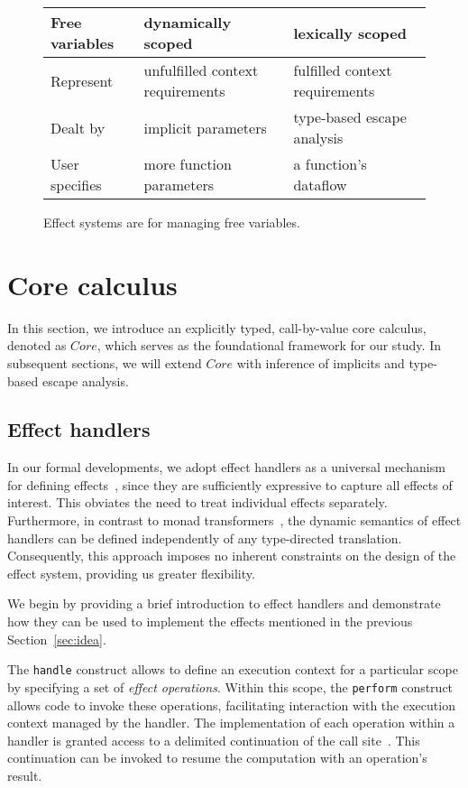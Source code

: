 \documentclass[acmsmall,review,screen]{acmart}
\begin{document}
\begin{figure}
    \centering
    \begin{tabular}{|l|l|l|}
        \hline
        Free variables & dynamically scoped & lexically scoped \\
        \hline
        Represent & unfulfilled context requirements & fulfilled context requirements \\
        Dealt by & implicit parameters & type-based escape analysis \\
        User specifies & more function parameters & a function’s dataflow \\
        \hline
    \end{tabular}
    \caption{Effect systems are for managing free variables.}
    \label{fig:free-vars}
\end{figure}


\section{Core calculus} \label{sec:core}

In this section, we introduce an explicitly typed, call-by-value core calculus, denoted as $Core$, which serves as the foundational framework for our study.
In subsequent sections, we will extend $Core$ with inference of implicits and type-based escape analysis.

\subsection{Effect handlers} \label{subsec:handlers}

In our formal developments, we adopt effect handlers as a universal mechanism for defining effects~\cite{plotkin2003algebraic, plotkin2013handling}, since they are sufficiently expressive to capture all effects of interest.
This obviates the need to treat individual effects separately.
Furthermore, in contrast to monad transformers~\cite{liang1995monad, schrijvers2019monad}, the dynamic semantics of effect handlers can be defined independently of any type-directed translation.
Consequently, this approach imposes no inherent constraints on the design of the effect system, providing us greater flexibility.

We begin by providing a brief introduction to effect handlers and demonstrate how they can be used to implement the effects mentioned in the previous Section~\ref{sec:idea}.

The \lstinline[language=colang]{handle} construct allows to define an execution context for a particular scope by specifying a set of \emph{effect operations}.
Within this scope, the \lstinline[language=colang]{perform} construct allows code to invoke these operations, facilitating interaction with the execution context managed by the handler.
The implementation of each operation within a handler is granted access to a delimited continuation of the call site~\cite{dyvbig2007monadic}.
This continuation can be invoked to resume the computation with an operation's result.
\end{document}
